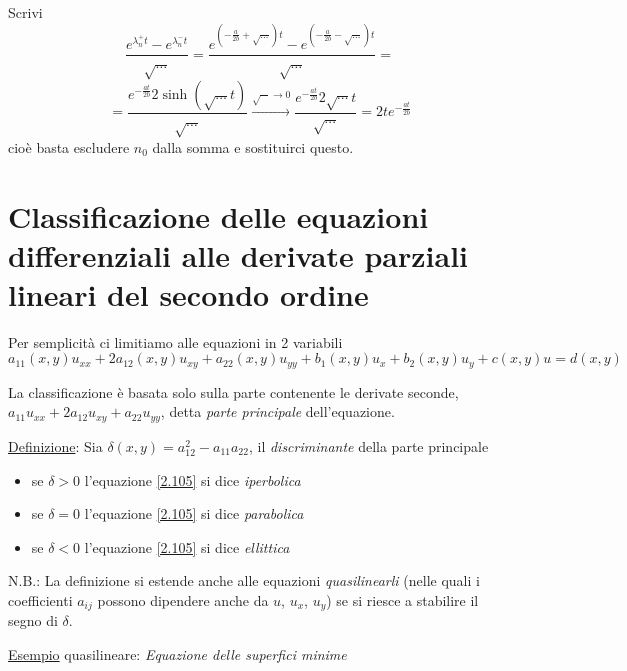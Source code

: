 \documentclass[a4paper,11pt]{report}
\begin{document}
Scrivi
\[
\frac{e^{\lambda_n^+ t} - e^{\lambda_n^- t}}{\sqrt{\dots}}= \frac{e^{\left(-\frac{a}{2b}+\sqrt{\dots}\right)t}- e^{\left(-\frac{a}{2b}-\sqrt{\dots}\right)t}}{\sqrt{\dots}}=
\]
\[
=\frac{e^{-\frac{at}{2b}} 2\sinh (\sqrt{\dots} t)}{\sqrt{\dots}} \xrightarrow{\sqrt{\cdots}\to 0} \frac{e^{-\frac{at}{2b}}2\sqrt{\cdots}t}{\sqrt{\cdots}}=2te^{-\frac{at}{2b}}
\]
cio\`e basta escludere $n_0$ dalla somma e sostituirci questo.

\section{Classificazione delle equazioni differenziali alle derivate parziali lineari del secondo ordine}

Per semplicit\`a ci limitiamo alle equazioni in 2 variabili
\begin{equation}
a_{11}(x,y)u_{xx} + 2a_{12}(x,y)u_{xy} + a_{22}(x,y)u_{yy} + b_{1}(x,y)u_{x} + b_2(x,y)u_y + c(x,y)u = d(x,y)
\label{2.105}
\end{equation}

La classificazione \`e basata solo sulla parte contenente le derivate seconde, $a_{11}u_{xx} + 2a_{12}u_{xy} +a_{22}u_{yy}$, detta \emph{parte principale} dell'equazione.

\smallskip

\underline{Definizione}: Sia $\delta(x,y)=a_{12}^2 - a_{11}a_{22}$, il \emph{discriminante} della parte principale
\begin{itemize}
\item se $\delta >0$ l'equazione \eqref{2.105} si dice \emph{iperbolica}
\item se $\delta =0$ l'equazione \eqref{2.105} si dice \emph{parabolica}
\item se $\delta <0$ l'equazione \eqref{2.105} si dice \emph{ellittica}
\end{itemize}
N.B.: La definizione si estende anche alle equazioni \emph{quasilinearli} (nelle quali i coefficienti $a_{ij}$ possono dipendere anche da $u$, $u_x$, $u_y$) se si riesce a stabilire il segno di $\delta$.

\medskip

\underline{Esempio} quasilineare: \emph{Equazione delle superfici minime}
\end{document}
